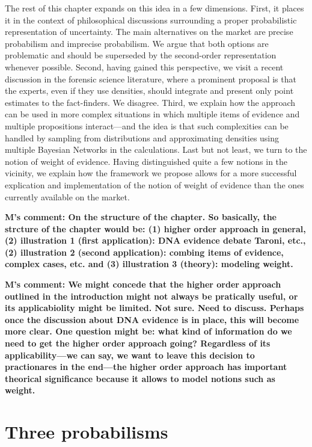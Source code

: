\documentclass[
  10pt,
  dvipsnames,enabledeprecatedfontcommands]{scrartcl}
\begin{document}
The rest of this chapter expands on this idea in a few dimensions.
First, it places it in the context of philosophical discussions
surrounding a proper probabilistic representation of uncertainty. The
main alternatives on the market are precise probabilism and imprecise
probabilism. We argue that both options are problematic and should be
superseded by the second-order representation whenever possible. Second,
having gained this perspective, we visit a recent discussion in the
forensic science literature, where a prominent proposal is that the
experts, even if they use densities, should integrate and present only
point estimates to the fact-finders. We disagree. Third, we explain how
the approach can be used in more complex situations in which multiple
items of evidence and multiple propositions interact---and the idea is
that such complexities can be handled by sampling from distributions and
approximating densities using multiple Bayesian Networks in the
calculations. Last but not least, we turn to the notion of weight of
evidence. Having distinguished quite a few notions in the vicinity, we
explain how the framework we propose allows for a more successful
explication and implementation of the notion of weight of evidence than
the ones currently available on the market.

\textbf{M's comment: On the structure of the chapter. So basically, the strcture of the chapter would be: (1) higher order approach in general, (2) illustration 1 (first application): DNA evidence debate Taroni, etc., (2) illustration 2 (second application): combing items of evidence, complex cases, etc. and (3)
illustration 3 (theory): modeling weight.}

\textbf{M's comment: We might concede that the higher order approach outlined in the introduction might not always be pratically useful, or its applicabiolity might be limited. Not sure. Need to discuss. Perhaps once the discussion about DNA evidence is in place, this will become more clear. One question might be: what kind of information do we need to get the higher order approach going? Regardless of its applicability---we can say, we want to leave this decision to practionares in the end---the higher order approach has important theorical significance because it allows to model notions such as weight.}

\hypertarget{three-probabilisms}{%
\section{Three probabilisms}\label{three-probabilisms}}
\end{document}
